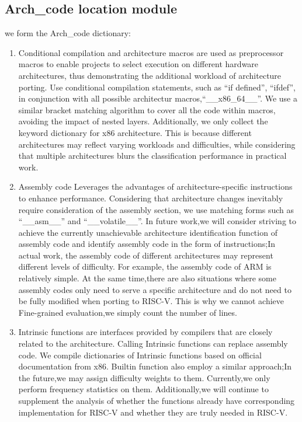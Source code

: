 \documentclass[sigconf,screen,review]{acmart}
\begin{document}
\subsection{Arch\_code location module}
we form the Arch\_code dictionary:
\begin{enumerate}
  \item Conditional compilation and architecture macros are used as preprocessor macros to enable projects to select execution on different hardware architectures, thus demonstrating the additional workload of architecture porting.
  Use conditional compilation statements, such as ``if defined'', ``ifdef'', in conjunction with all possible architectur macros,``\_\_x86\_64\_\_''.
  We use a similar bracket matching algorithm to cover all the code within macros, avoiding the impact of nested layers.
  Additionally, we only collect the keyword dictionary for x86 architecture.
  This is because different architectures may reflect varying workloads and difficulties, while considering that multiple architectures blurs the classification performance in practical work.
  \item Assembly code Leverages the advantages of architecture-specific instructions to enhance performance.
  Considering that architecture changes inevitably require consideration of the assembly section, we use matching forms such as ``\_\_asm\_\_'' and ``\_\_volatile\_\_''.
  In future work,we will consider striving to achieve the currently unachievable architecture identification function of assembly code and identify assembly code in the form of instructions;In actual work, the assembly code of different architectures may represent different levels of difficulty.
  For example, the assembly code of ARM is relatively simple.
  At the same time,there are also situations where some assembly codes only need to serve a specific architecture and do not need to be fully modified when porting to RISC-V.
  This is why we cannot achieve Fine-grained evaluation,we simply count the number of lines.
  \item Intrinsic functions are interfaces provided by compilers that are closely related to the architecture.
  Calling Intrinsic functions can replace assembly code.
  We compile dictionaries of Intrinsic functions based on official documentation from x86.
  Builtin function also employ a similar approach;In the future,we may assign difficulty weights to them.
  Currently,we only perform frequency statistics on them.
  Additionally,we will continue to supplement the analysis of whether the functions already have corresponding implementation for RISC-V and whether they are truly needed in RISC-V.

\end{enumerate}
\end{document}
